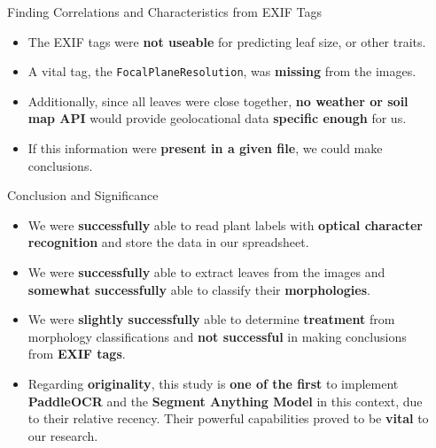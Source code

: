 \documentclass[final]{beamer}
\newlength{\sepwidth}
\newlength{\colwidth}
\newcommand{\separatorcolumn}{\begin{column}{\sepwidth}\end{column}}
\begin{document}
\begin{frame}[t]
\begin{columns}[t]
\begin{column}{\colwidth}
\begin{block}{Finding Correlations and Characteristics from EXIF Tags}
\begin{itemize}
    \item The EXIF tags were \textbf{not useable} for predicting leaf size, or other traits. 
    \item A vital tag, the \texttt{FocalPlaneResolution}, was \textbf{missing} from the images.
    \item Additionally, since all leaves were close together, \textbf{no weather or soil map API} would provide geolocational data \textbf{specific enough} for us.
    \item If this information were \textbf{present in a given file}, we could make conclusions.
\end{itemize}


\end{block}

\begin{exampleblock}{Conclusion and Significance}


\begin{itemize}
    \item We were \textbf{successfully} able to read plant labels with \textbf{optical character recognition} and store the data in our spreadsheet. 
    \item We were \textbf{successfully} able to extract leaves from the images and \textbf{somewhat successfully} able to classify their \textbf{morphologies}.
    \item We were \textbf{slightly successfully} able to determine \textbf{treatment} from morphology classifications and \textbf{not successful} in making conclusions from \textbf{EXIF tags}.
    \item Regarding \textbf{originality}, this study is \textbf{one of the first} to implement \textbf{PaddleOCR} and the \textbf{Segment Anything Model} in this context, due to their relative recency. Their powerful capabilities proved to be \textbf{vital} to our research.
\end{itemize}

    
\end{exampleblock}

\end{column}

\separatorcolumn

\end{columns}

\end{frame}
\end{document}
